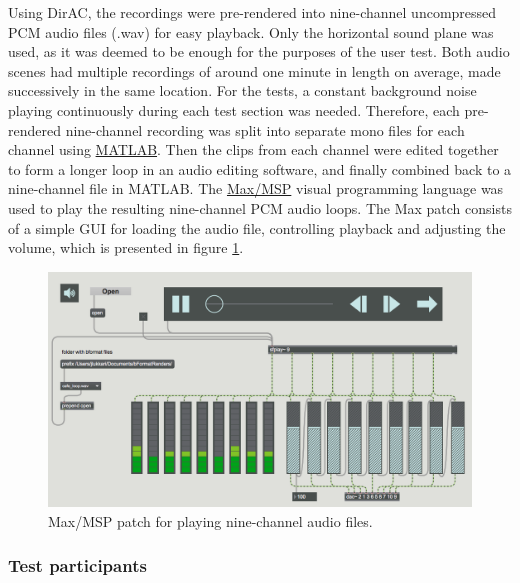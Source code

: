 \documentclass[english, 12pt, a4paper, pdftex, elec, utf8]{aaltothesis}
\begin{document}
Using DirAC, the recordings were pre-rendered into nine-channel uncompressed PCM audio files (.wav) for easy playback. Only the horizontal sound plane was used, as it was deemed to be enough for the purposes of the user test. Both audio scenes had multiple recordings of around one minute in length on average, made successively in the same location. For the tests, a constant background noise playing continuously during each test section was needed. Therefore, each pre-rendered nine-channel recording was split into separate mono files for each channel using \href{https://se.mathworks.com/products/matlab.html}{MATLAB}. Then the clips from each channel were edited together to form a longer loop in an audio editing software, and finally combined back to a nine-channel file in MATLAB. The \href{https://cycling74.com/products/max/}{Max/MSP} visual programming language was used to play the resulting nine-channel PCM audio loops. The Max patch consists of a simple GUI for loading the audio file, controlling playback and adjusting the volume, which is presented in figure \ref{fig:max}. \\
\begin{figure}[h]
    \centering
    \includegraphics[width=\textwidth]{max.png}
    \caption{Max/MSP patch for playing nine-channel audio files.}
    \label{fig:max} 
\end{figure}

\subsubsection{Test participants}
\end{document}
